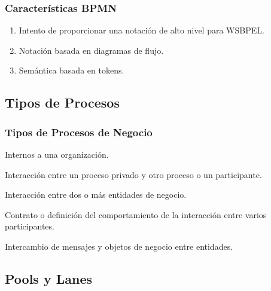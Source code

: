 \documentclass[handout,a4paper,slidestop,xcolor=pst,blue]{beamer}
\begin{document}
\begin{frame}[c]
    \frametitle{Características BPMN}
    \begin{enumerate}[<+->]
        \item Intento de proporcionar una notación de alto nivel para WSBPEL.
        \item Notación basada en diagramas de flujo.
        \item Semántica basada en tokens.
    \end{enumerate}
\end{frame}

\subsection{Tipos de Procesos}

\begin{frame}[c]
    \frametitle{Tipos de Procesos de Negocio}
    \begin{description}[<+->]
        \item[Privados] Internos a una organización.
        \item[Públicos] Interacción entre un proceso privado y otro proceso o un participante.
        \item[Colaboración] Interacción entre dos o más entidades de negocio.
        \item[Coreografías] Contrato o definición del comportamiento de la interacción entre varios participantes.
        \item[Conversaciones] Intercambio de mensajes y objetos de negocio entre entidades.
    \end{description}
\end{frame}

\subsection{Pools y Lanes}
\end{document}
